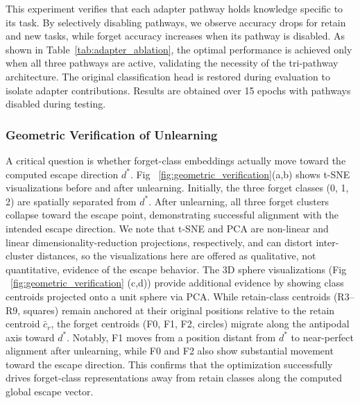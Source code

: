 This experiment verifies that each adapter pathway holds knowledge specific to its task. By selectively disabling pathways, we observe accuracy drops for retain and new tasks, while forget accuracy increases when its pathway is disabled. As shown in Table~\ref{tab:adapter_ablation}, the optimal performance is achieved only when all three pathways are active, validating the necessity of the tri-pathway architecture. The original classification head is restored during evaluation to isolate adapter contributions. Results are obtained over 15 epochs with pathways disabled during testing.

\subsubsection{Geometric Verification of Unlearning}
\label{7.5}
A critical question is whether forget-class embeddings actually move toward the computed escape direction $d^*$. Fig ~\ref{fig:geometric_verification}(a,b) shows t-SNE visualizations before and after unlearning. Initially, the three forget classes (0, 1, 2) are spatially separated from $d^*$. After unlearning, all three forget clusters collapse toward the escape point, demonstrating successful alignment with the intended escape direction. We note that t-SNE and PCA are non-linear and linear dimensionality-reduction projections, respectively, and can distort inter-cluster distances, so the visualizations here are offered as qualitative, not quantitative, evidence of the escape behavior.
The 3D sphere visualizations (Fig ~\ref{fig:geometric_verification} (c,d)) provide additional evidence by showing class centroids projected onto a unit sphere via PCA. While retain-class centroids (R3--R9, squares) remain anchored at their original positions relative to the retain centroid $\bar{c}_r$, the forget centroids (F0, F1, F2, circles) migrate along the antipodal axis toward $d^*$. Notably, F1 moves from a position distant from $d^*$ to near-perfect alignment after unlearning, while F0 and F2 also show substantial movement toward the escape direction. This confirms that the optimization successfully drives forget-class representations away from retain classes along the computed global escape vector.


